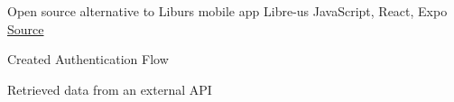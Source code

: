 \begin{cventries}

  \cventry
    {Open source alternative to Liburs mobile app} %
    {Libre-us} %
    {JavaScript, React, Expo} %
    {\href{https://github.com/rustysnek/libre-us}{\faGithubSquare\acvHeaderIconSep Source}} %
    {
      \begin{cvitems} %
        \item {Created Authentication Flow}
        \item {Retrieved data from an external API}
      \end{cvitems}
    } %



\end{cventries}
